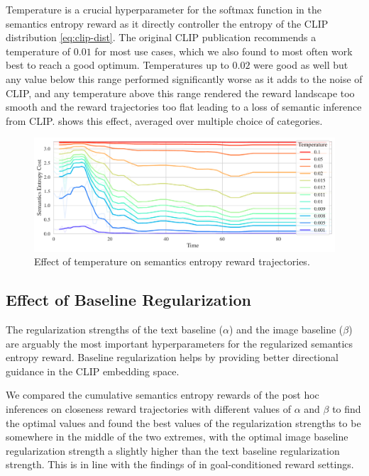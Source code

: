 Temperature is a crucial hyperparameter for the softmax function in the semantics entropy reward as it directly controller the entropy of the CLIP distribution \eqref{eq:clip-dist}.
The original CLIP publication recommends a temperature of \(0.01\) for most use cases, which we also found to most often work best to reach a good optimum.
Temperatures up to \(0.02\) were good as well but any value below this range performed significantly worse as it adds to the noise of CLIP, and any temperature above this range rendered the reward landscape too smooth and the reward trajectories too flat leading to a loss of semantic inference from CLIP.
 shows this effect, averaged over multiple choice of categories.

\begin{figure}[H]
    \centering
    \includegraphics[width=\textwidth]{images/temperature_comparison.pdf}
    \caption{Effect of temperature on semantics entropy reward trajectories.}
    \label{fig:clip-temperature}    
\end{figure}

\subsection{Effect of Baseline Regularization}
\label{sec:reg-alpha-beta}

The regularization strengths of the text baseline (\(\alpha\)) and the image baseline (\(\beta\)) are arguably the most important hyperparameters for the regularized semantics entropy reward.
Baseline regularization helps by providing better directional guidance in the CLIP embedding space.

We compared the cumulative semantics entropy rewards of the post hoc inferences on closeness reward trajectories with different values of \(\alpha\) and \(\beta\) to find the optimal values and found the best values of the regularization strengths to be somewhere in the middle of the two extremes, with the optimal image baseline regularization strength a slightly higher than the text baseline regularization strength.
This is in line with the findings of \cite{vlmrm} in goal-conditioned reward settings.

